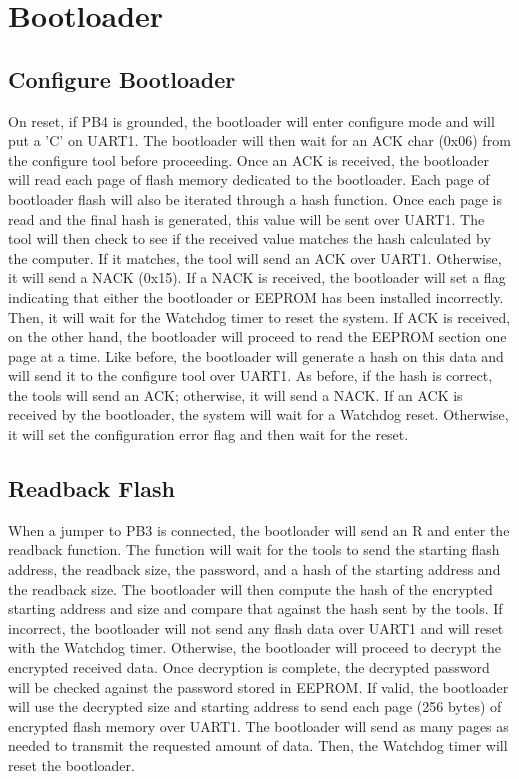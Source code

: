\documentclass[11pt]{article}
\begin{document}
\section{Bootloader}
\subsection{Configure Bootloader}
On reset, if PB4 is grounded, the bootloader will enter configure mode and will put a 'C' on UART1.  The bootloader will then wait for an ACK char (0x06) from the configure tool before proceeding.  Once an ACK is received, the bootloader will read each page of flash memory dedicated to the bootloader.  Each page of bootloader flash will also be iterated through a hash function.  Once each page is read and the final hash is generated, this value will be sent over UART1.  The tool will then check to see if the received value matches the hash calculated by the computer.  If it matches, the tool will send an ACK over UART1.  Otherwise, it will send a NACK (0x15).  If a NACK is received, the bootloader will set a flag indicating that either the bootloader or EEPROM has been installed incorrectly.  Then, it will wait for the Watchdog timer to reset the system.  If ACK is received, on the other hand, the bootloader will proceed to read the EEPROM section one page at a time.  Like before, the bootloader will generate a hash on this data and will send it to the configure tool over UART1.  As before, if the hash is correct, the tools will send an ACK; otherwise, it will send a NACK.  If an ACK is received by the bootloader, the system will wait for a Watchdog reset.  Otherwise, it will set the configuration error flag and then wait for the reset.
\subsection{Readback Flash}
When a jumper to PB3 is connected, the bootloader will send an R and enter the readback function.  The function will wait for the tools to send the starting flash address, the readback size, the password, and a hash of the starting address and the readback size.  The bootloader will then compute the hash of the encrypted starting address and size and compare that against the hash sent by the tools.  If incorrect, the bootloader will not send any flash data over UART1 and will reset with the Watchdog timer. Otherwise, the bootloader will proceed to decrypt the encrypted received data.  Once decryption is complete, the decrypted password will be checked against the password stored in EEPROM.  If valid, the bootloader will use the decrypted size and starting address to send each page (256 bytes) of encrypted flash memory over UART1.  The bootloader will send as many pages as needed to transmit the requested amount of data.  Then, the Watchdog timer will reset the bootloader. 
\end{document}
